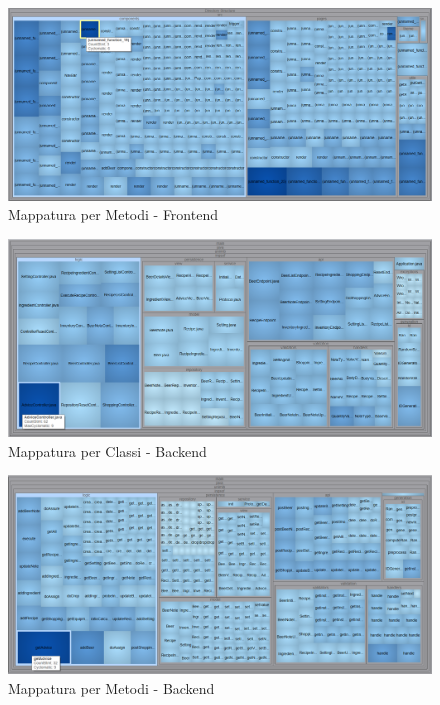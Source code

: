 \documentclass[a4paper,12pt]{report}
\begin{document}
		\begin{figure}[!h]
			\centering
			\includegraphics[width=0.9\linewidth]{image/F-Metodi.png}
			\caption{Mappatura per Metodi - Frontend}\label{fig:F-Metodi}
		\end{figure}    

		\begin{figure}[!h]
			\centering
			\includegraphics[width=0.9\linewidth]{image/B-Classi.png}
			\caption{Mappatura per Classi - Backend}\label{fig:B-Classi}
		\end{figure}    

		\begin{figure}[!h]
			\centering
			\includegraphics[width=0.9\linewidth]{image/B-Metodi.png}
			\caption{Mappatura per Metodi - Backend}\label{fig:B-Metodi}
		\end{figure}    
	
		 	
\end{document}

